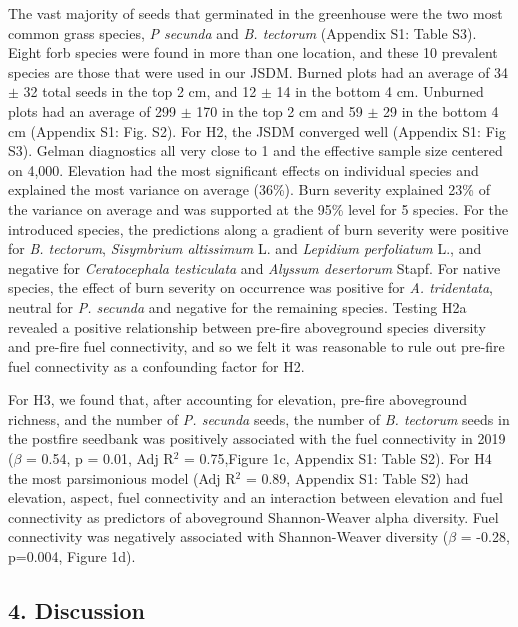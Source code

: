 \documentclass[
  12pt,
]{article}
\begin{document}
The vast majority of seeds that germinated in the greenhouse were the
two most common grass species, \emph{P secunda} and \emph{B. tectorum}
(Appendix S1: Table S3). Eight forb species were found in more than one
location, and these 10 prevalent species are those that were used in our
JSDM. Burned plots had an average of 34 \(\pm\) 32 total seeds in the
top 2 cm, and 12 \(\pm\) 14 in the bottom 4 cm. Unburned plots had an
average of 299 \(\pm\) 170 in the top 2 cm and 59 \(\pm\) 29 in the
bottom 4 cm (Appendix S1: Fig. S2). For H2, the JSDM converged well
(Appendix S1: Fig S3). Gelman diagnostics all very close to 1 and the
effective sample size centered on 4,000. Elevation had the most
significant effects on individual species and explained the most
variance on average (36\%). Burn severity explained 23\% of the variance
on average and was supported at the 95\% level for 5 species. For the
introduced species, the predictions along a gradient of burn severity
were positive for \emph{B. tectorum}, \emph{Sisymbrium altissimum} L.
and \emph{Lepidium perfoliatum} L., and negative for \emph{Ceratocephala
testiculata} and \emph{Alyssum desertorum} Stapf. For native species,
the effect of burn severity on occurrence was positive for \emph{A.
tridentata}, neutral for \emph{P. secunda} and negative for the
remaining species. Testing H2a revealed a positive relationship between
pre-fire aboveground species diversity and pre-fire fuel connectivity,
and so we felt it was reasonable to rule out pre-fire fuel connectivity
as a confounding factor for H2.

For H3, we found that, after accounting for elevation, pre-fire
aboveground richness, and the number of \emph{P. secunda} seeds, the
number of \emph{B. tectorum} seeds in the postfire seedbank was
positively associated with the fuel connectivity in 2019 (\(\beta\) =
0.54, p = 0.01, Adj R\(^2\) = 0.75,Figure 1c, Appendix S1: Table S2).
For H4 the most parsimonious model (Adj R\(^2\) = 0.89, Appendix S1:
Table S2) had elevation, aspect, fuel connectivity and an interaction
between elevation and fuel connectivity as predictors of aboveground
Shannon-Weaver alpha diversity. Fuel connectivity was negatively
associated with Shannon-Weaver diversity (\(\beta\) = -0.28, p=0.004,
Figure 1d).

\hypertarget{discussion}{%
\subsection{4. Discussion}\label{discussion}}
\end{document}
